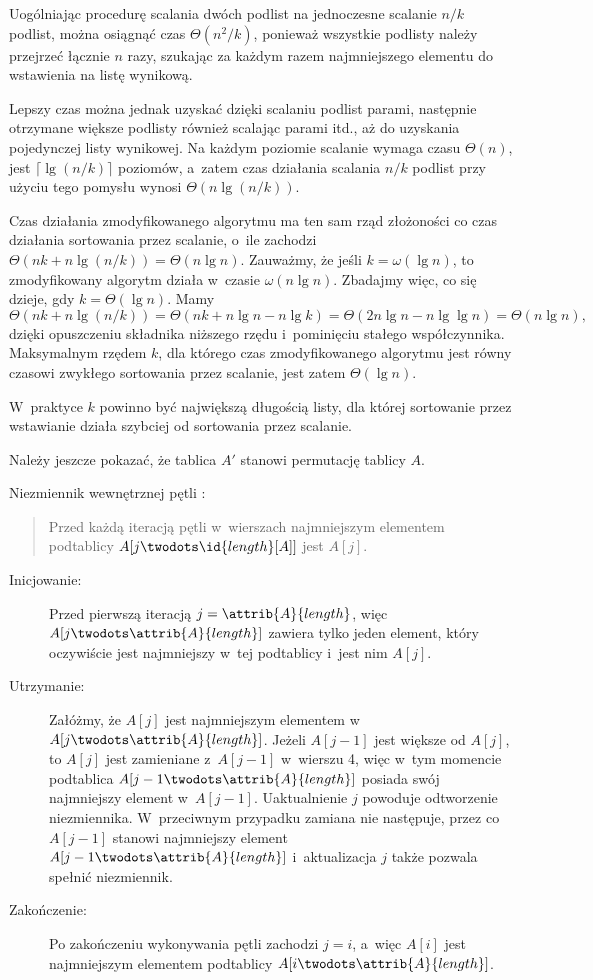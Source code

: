 \subproblem %
Uogólniając procedurę scalania dwóch podlist na jednoczesne scalanie $n/k$ podlist, można osiągnąć czas $\Theta(n^2\!/k)$, ponieważ wszystkie podlisty należy przejrzeć łącznie $n$ razy, szukając za każdym razem najmniejszego elementu do wstawienia na listę wynikową.

Lepszy czas można jednak uzyskać dzięki scalaniu podlist parami, następnie otrzymane większe podlisty również scalając parami itd., aż do uzyskania pojedynczej listy wynikowej.
Na każdym poziomie scalanie wymaga czasu $\Theta(n)$, jest $\lceil\lg(n/k)\rceil$ poziomów, a~zatem czas działania scalania $n/k$ podlist przy użyciu tego pomysłu wynosi $\Theta(n\lg(n/k))$.

\subproblem %
Czas działania zmodyfikowanego algorytmu ma ten sam rząd złożoności co czas działania sortowania przez scalanie, o~ile zachodzi $\Theta(nk+n\lg(n/k))=\Theta(n\lg n)$.
Zauważmy, że jeśli $k=\omega(\lg n)$, to zmodyfikowany algorytm działa w~czasie $\omega(n\lg n)$.
Zbadajmy więc, co się dzieje, gdy $k=\Theta(\lg n)$.
Mamy
\[
	\Theta(nk+n\lg(n/k)) = \Theta(nk+n\lg n-n\lg k) = \Theta(2n\lg n-n\lg\lg n) = \Theta(n\lg n),
\]
dzięki opuszczeniu składnika niższego rzędu i~pominięciu stałego współczynnika.
Maksymalnym rzędem $k$, dla którego czas zmodyfikowanego algorytmu jest równy czasowi zwykłego sortowania przez scalanie, jest zatem $\Theta(\lg n)$.

\subproblem %
W~praktyce $k$ powinno być największą długością listy, dla której sortowanie przez wstawianie działa szybciej od sortowania przez scalanie.


\subproblem %
Należy jeszcze pokazać, że tablica $A'$ stanowi permutację tablicy $A$.

\subproblem %
Niezmiennik wewnętrznej pętli :
\begin{quote}
Przed każdą iteracją pętli  w~wierszach  najmniejszym elementem podtablicy $A[j\twodots\id{length}[A]]$ jest $A[j]$.
\end{quote}
\begin{description}
	\item[Inicjowanie:] Przed pierwszą iteracją $j=\attrib{A}{length}$, więc $A[j\twodots\attrib{A}{length}]$ zawiera tylko jeden element, który oczywiście jest najmniejszy w~tej podtablicy i~jest nim $A[j]$.
	\item[Utrzymanie:] Załóżmy, że $A[j]$ jest najmniejszym elementem w~$A[j\twodots\attrib{A}{length}]$.
Jeżeli $A[j-1]$ jest większe od $A[j]$, to $A[j]$ jest zamieniane z~$A[j-1]$ w~wierszu 4, więc w~tym momencie podtablica $A[j-1\twodots\attrib{A}{length}]$ posiada swój najmniejszy element w~$A[j-1]$.
Uaktualnienie $j$ powoduje odtworzenie niezmiennika.
W~przeciwnym przypadku zamiana nie następuje, przez co $A[j-1]$ stanowi najmniejszy element $A[j-1\twodots\attrib{A}{length}]$ i~aktualizacja $j$ także pozwala spełnić niezmiennik.
	\item[Zakończenie:] Po zakończeniu wykonywania pętli zachodzi $j=i$, a~więc $A[i]$ jest najmniejszym elementem podtablicy $A[i\twodots\attrib{A}{length}]$.
\end{description}

